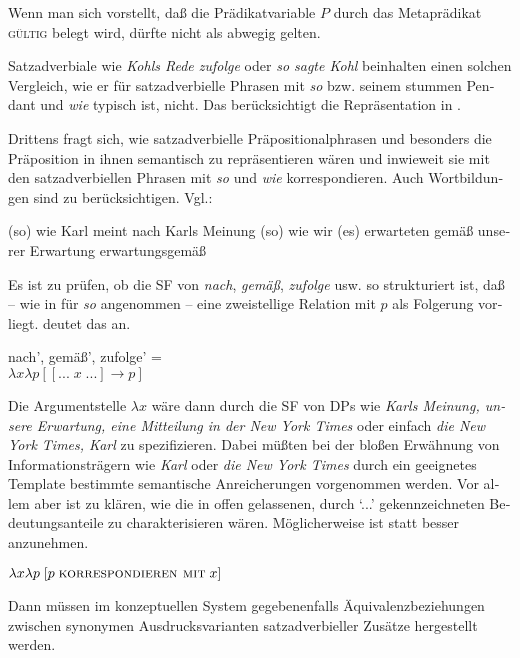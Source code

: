 \documentclass[output=paper, colorlinks, citecolor=brown, booklanguage=german]{langscibook}
\begin{document}
\begin{otherlanguage}{german}
\noindent Wenn man sich vorstellt, daß die Prädikatvariable $P$ durch das Metaprädikat \textsc{gültig} belegt wird, dürfte  nicht als abwegig gelten.

Satzadverbiale wie \textit{Kohls Rede zufolge} oder \textit{so sagte Kohl} beinhalten einen solchen Vergleich, wie er für satzadverbielle Phrasen mit \textit{so} bzw. seinem stummen Pendant und \textit{wie} typisch ist, nicht. Das berücksichtigt die Repräsentation in .

Drittens fragt sich, wie satzadverbielle Präpositionalphrasen und besonders die Präposition in ihnen semantisch zu repräsentieren wären und inwieweit sie mit den satzadverbiellen Phrasen mit \textit{so} und \textit{wie} korrespondieren. Auch Wortbildungen sind zu berücksichtigen. Vgl.:

\ea \label{ex:zi97:60}
    \ea (so) wie Karl meint \label{ex:zi97:60a}
    \ex nach Karls Meinung \label{ex:zi97:60b}
    \z
\ex \label{ex:zi97:61}
    \ea (so) wie wir (es) erwarteten
    \ex gemäß unserer Erwartung
    \ex erwartungsgemäß
    \z
\z

\noindent Es ist zu prüfen, ob die SF von \textit{nach}, \textit{gemäß}, \textit{zufolge} usw. so strukturiert ist, daß -- wie in  für \textit{so} angenommen -- eine zweistellige Relation mit $p$ als Folgerung vorliegt.  deutet das an.

\ea \label{ex:zi97:62} nach', gemäß', zufolge' = \\
$\lambda x \lambda p [[... \; x \; ...] \rightarrow p]$
\z

Die Argumentstelle $\lambda x$ wäre dann durch die SF von DPs wie \textit{Karls Meinung, unsere Erwartung, eine Mitteilung in der New York Times} oder einfach \textit{die New York Times, Karl} zu spezifizieren. Dabei müßten bei der bloßen Erwähnung von Informationsträgern wie \textit{Karl} oder \textit{die New York Times} durch ein geeignetes Template bestimmte semantische Anreicherungen vorgenommen werden. Vor allem aber ist zu klären, wie die in  offen gelassenen, durch `...' gekennzeichneten Bedeutungsanteile zu charakterisieren wären. Möglicherweise ist statt  besser  anzunehmen.

\ea \label{ex:zi97:63} $\lambda x \lambda p \; [p \; \textsc{korrespondieren mit} \; x]$
\z

\noindent Dann müssen im konzeptuellen System gegebenenfalls Äquivalenzbeziehungen zwischen synonymen Ausdrucksvarianten satzadverbieller Zusätze hergestellt werden.


\end{otherlanguage}
\end{document}
